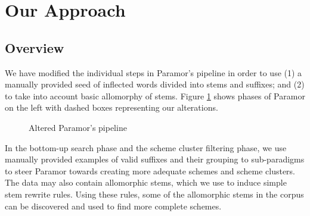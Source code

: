 \documentclass{itatnew}
\begin{document}
%

\section{Our Approach}

\subsection{Overview}


\noindent
We have modified the individual steps in Paramor's pipeline in order to use (1) a manually provided seed of inflected words divided into stems and suffixes; and (2) to take into account basic allomorphy of stems.
%
Figure \ref{fig:overview} shows phases of Paramor on the left with dashed boxes representing our alterations.


\begin{figure}

\caption{Altered Paramor's pipeline}
\label{fig:overview}
\end{figure}

In the bottom-up search phase and the scheme cluster filtering phase, we use manually provided examples of valid suffixes and their grouping to sub-paradigms to steer Paramor towards creating more adequate schemes and scheme clusters. The data may also contain allomorphic stems, which we use to induce simple stem rewrite rules. Using these rules, some of the allomorphic stems in the corpus can be discovered and used to find more complete schemes. %

\end{document}
